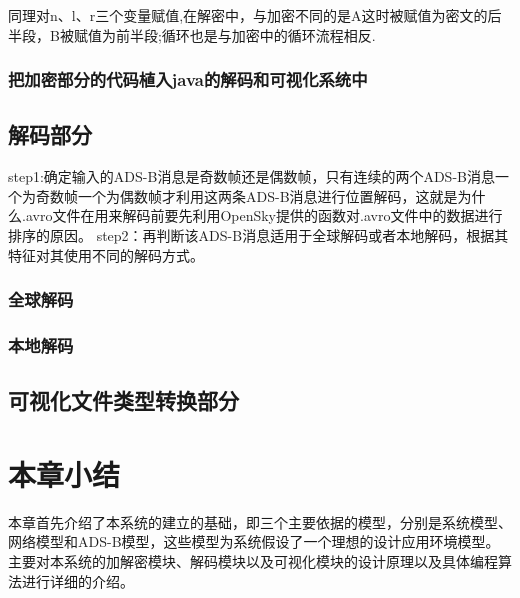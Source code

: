 
        
同理对n、l、r三个变量赋值,在解密中，与加密不同的是A这时被赋值为密文的后半段，B被赋值为前半段;循环也是与加密中的循环流程相反.        
\subsubsection{把加密部分的代码植入java的解码和可视化系统中}

  

\subsection{解码部分}
step1:确定输入的ADS-B消息是奇数帧还是偶数帧，只有连续的两个ADS-B消息一个为奇数帧一个为偶数帧才利用这两条ADS-B消息进行位置解码，这就是为什么.avro文件在用来解码前要先利用OpenSky提供的函数对.avro文件中的数据进行排序的原因。\newline
step2：再判断该ADS-B消息适用于全球解码或者本地解码，根据其特征对其使用不同的解码方式。



\subsubsection{全球解码}


			
\subsubsection{本地解码}



\subsection{可视化文件类型转换部分}



\section{本章小结}
本章首先介绍了本系统的建立的基础，即三个主要依据的模型，分别是系统模型、网络模型和ADS-B模型，这些模型为系统假设了一个理想的设计应用环境模型。主要对本系统的加解密模块、解码模块以及可视化模块的设计原理以及具体编程算法进行详细的介绍。
